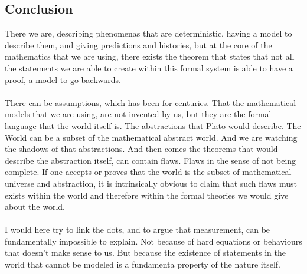 \documentclass[10pt,a4paper]{article}
\newcounter{theo}
\begin{document}
    \subsection{Conclusion}
        There we are, describing phenomenas that are deterministic, having a model to describe them, and giving predictions and histories, but at the core of the mathematics that we are using, there exists the theorem that states that not all the statements we are able to create within this formal system is able to have a proof, a model to go backwards.
        \\
        \\
        There can be assumptions, which has been for centuries. That the mathematical models that we are using, are not invented by us, but they are the formal language that the world itself is. The abstractions that Plato would describe. The World can be a subset of the mathematical abstract world. And we are watching the shadows of that abstractions. And then comes the theorems that would describe the abstraction itself, can contain flaws. Flaws in the sense of not being complete. If one accepts or proves that the world is the subset of mathematical universe and abstraction, it is intrinsically obvious to claim that such flaws must exists within the world and therefore within the formal theories we would give about the world.
        \\
        \\
        I would here try to link the dots, and to argue that measurement, can be fundamentally impossible to explain. Not because of hard equations or behaviours that doesn't make sense to us. But because the existence of statements in the world that cannot be modeled is a fundamenta property of the nature itself.
\end{document}

